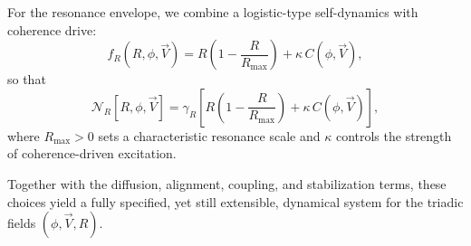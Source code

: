 For the resonance envelope, we combine a logistic-type self-dynamics with coherence drive:
\begin{equation}
    f_R(R, \phi, \vec{V})
    = R \left( 1 - \frac{R}{R_{\max}} \right)
      + \kappa\, C(\phi, \vec{V}),
\end{equation}
so that
\begin{equation}
    \mathcal{N}_R[R, \phi, \vec{V}]
    = \gamma_R \left[
        R \left( 1 - \frac{R}{R_{\max}} \right)
        + \kappa\, C(\phi, \vec{V})
    \right],
\end{equation}
where $R_{\max} > 0$ sets a characteristic resonance scale and $\kappa$ controls the
strength of coherence-driven excitation.

Together with the diffusion, alignment, coupling, and stabilization terms, these choices
yield a fully specified, yet still extensible, dynamical system for the triadic fields
$(\phi, \vec{V}, R)$.
